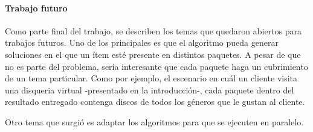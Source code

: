 \paragraph{Trabajo futuro} Como parte final del trabajo, se describen los temas que quedaron abiertos para trabajos futuros. Uno de los principales es que el algoritmo pueda generar soluciones en el que un ítem esté presente en distintos paquetes. A pesar de que no es parte del problema, sería interesante que cada paquete haga un cubrimiento de un tema particular. Como por ejemplo, el escenario en cuál un cliente visita una disqueria virtual -presentado en la introducción-, cada paquete dentro del resultado entregado contenga discos de todos los géneros que le gustan al cliente.

Otro tema que surgió es adaptar los algoritmos para que se ejecuten en paralelo.